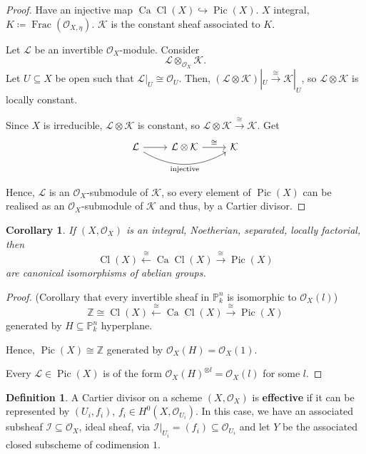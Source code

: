 \documentclass[12pt]{article}
\DeclareMathOperator{\Frac}{Frac}
\DeclareMathOperator{\Pic}{Pic}
\DeclareMathOperator{\Cl}{Cl}
\DeclareMathOperator{\Ca}{Ca}
\newtheorem*{corollary}{Corollary}
\theoremstyle{definition}
\newtheorem*{definition}{Definition}
\begin{document}
\begin{proof}
Have an injective map $\Ca\Cl(X)\hookrightarrow\Pic(X)$. $X$ integral, $K\coloneqq\Frac(\mathcal{O}_{X,\eta})$. $\mathcal{K}$ is the constant sheaf associated to $K$.

Let $\mathcal{L}$ be an invertible $\mathcal{O}_X$-module. Consider
\[\mathcal{L}\otimes_{\mathcal{O}_X}\mathcal{K}.\]
Let $U\subseteq X$ be open such that $\mathcal{L}|_U\cong\mathcal{O}_U$. Then, $(\mathcal{L}\otimes\mathcal{K})|_U\overset{\cong}{\longrightarrow}\mathcal{K}|_U$, so $\mathcal{L}\otimes\mathcal{K}$ is locally constant.

Since $X$ is irreducible, $\mathcal{L}\otimes\mathcal{K}$ is constant, so $\mathcal{L}\otimes\mathcal{K}\xrightarrow{\cong}\mathcal{K}$. Get
\[
\begin{tikzcd}
\mathcal{L}\arrow[r]\arrow[rr,bend right,"\text{injective}",swap]&\mathcal{L}\otimes\mathcal{K}\arrow[r,"\cong"]&\mathcal{K}
\end{tikzcd}
\]

Hence, $\mathcal{L}$ is an $\mathcal{O}_X$-submodule of $\mathcal{K}$, so every element of $\Pic(X)$ can be realised as an $\mathcal{O}_X$-submodule of $\mathcal{K}$ and thus, by a Cartier divisor.
\end{proof}

\begin{corollary}
If $(X,\mathcal{O}_X)$ is an integral, Noetherian, separated, locally factorial, then
\[\Cl(X)\overset{\cong}{\longleftarrow}\Ca\Cl(X)\overset{\cong}{\longrightarrow}\Pic(X)\]
are canonical isomorphisms of abelian groups.
\end{corollary}

\begin{proof}
(Corollary that every invertible sheaf in $\mathbb{P}_k^n$ is isomorphic to $\mathcal{O}_X(l)$)
\[\mathbb{Z}\cong\Cl(X)\overset{\cong}{\longleftarrow}\Ca\Cl(X)\overset{\cong}{\longrightarrow}\Pic(X)\]
generated by $H\subseteq\mathbb{P}_k^n$ hyperplane.

Hence, $\Pic(X)\cong\mathbb{Z}$ generated by $\mathcal{O}_X(H)=\mathcal{O}_X(1)$.

Every $\mathcal{L}\in\Pic(X)$ is of the form $\mathcal{O}_X(H)^{\otimes l}=\mathcal{O}_X(l)$ for some $l$.
\end{proof}

\begin{definition}
A Cartier divisor on a scheme $(X,\mathcal{O}_X)$ is \textbf{effective} if it can be represented by $(U_i,f_i)$, $f_i\in H^0(X,\mathcal{O}_{U_i})$. In this case, we have an associated subsheaf $\mathcal{I}\subseteq\mathcal{O}_X$, ideal sheaf, via $\mathcal{I}|_{U_i}=(f_i)\subseteq\mathcal{O}_{U_i}$ and let $Y$ be the associated closed subscheme of codimension $1$.
\end{definition}
\end{document}
